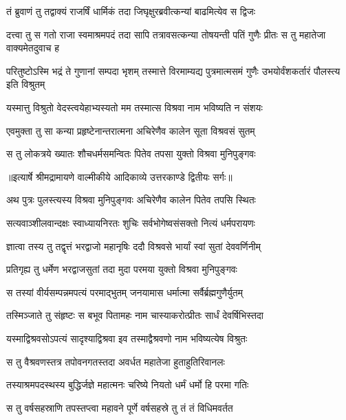 \twolineshloka
{तं ब्रुवाणं तु तद्वाक्यं राजर्षिं धार्मिकं तदा}
{जिघृक्षुरब्रवीत्कन्यां बाढमित्येव स द्विजः} %

\threelineshloka
{दत्त्वा तु स गतो राजा स्वमाश्रमपदं तदा}
{सापि तत्रावसत्कन्या तोषयन्ती पतिं गुणैः}
{प्रीतः स तु महातेजा वाक्यमेतदुवाच ह} %

\threelineshloka
{परितुष्टोऽस्मि भद्रं ते गुणानां सम्पदा भृशम्}
{तस्मात्ते विरमाम्यद्य पुत्रमात्मसमं गुणैः}
{उभयोर्वंशकर्तारं पौलस्त्य इति विश्रुतम्} %

\twolineshloka
{यस्मात्तु विश्रुतो वेदस्त्वयेहाभ्यस्यतो मम}
{तस्मात्स विश्रवा नाम भविष्यति न संशयः} %

\twolineshloka
{एवमुक्ता तु सा कन्या प्रहृष्टेनान्तरात्मना}
{अचिरेणैव कालेन सूता विश्रवसं सुतम्} %

\twolineshloka
{स तु लोकत्रये ख्यातः शौचधर्मसमन्वितः}
{पितेव तपसा युक्तो विश्रवा मुनिपुङ्गवः} %


{॥इत्यार्षे श्रीमद्रामायणे वाल्मीकीये आदिकाव्ये उत्तरकाण्डे द्वितीयः सर्गः॥}


\twolineshloka
{अथ पुत्रः पुलस्त्यस्य विश्रवा मुनिपुङ्गवः}
{अचिरेणैव कालेन पितेव तपसि स्थितः} %

\twolineshloka
{सत्यवाञ्शीलवान्दक्षः स्वाध्यायनिरतः शुचिः}
{सर्वभोगेष्वसंसक्तो नित्यं धर्मपरायणः} %

\twolineshloka
{ज्ञात्वा तस्य तु तद्वृत्तं भरद्वाजो महानृषिः}
{ददौ विश्रवसे भार्यां स्वां सुतां देववर्णिनीम्} %

\twolineshloka
{प्रतिगृह्य तु धर्मेण भरद्वाजसुतां तदा}
{मुदा परमया युक्तो विश्रवा मुनिपुङ्गवः} %

\twolineshloka
{स तस्यां वीर्यसम्पन्नमपत्यं परमाद्भुतम्}
{जनयामास धर्मात्मा सर्वैर्ब्रह्मगुणैर्युतम्} %

\twolineshloka
{तस्मिञ्जाते तु संहृष्टः स बभूव पितामहः}
{नाम चास्याकरोत्प्रीतः सार्धं देवर्षिभिस्तदा} %

\twolineshloka
{यस्माद्विश्रवसोऽपत्यं सादृश्याद्विश्रवा इव}
{तस्माद्वैश्रवणो नाम भविष्यत्येष विश्रुतः} %

\twolineshloka
{स तु वैश्रवणस्तत्र तपोवनगतस्तदा}
{अवर्धत महातेजा हुताहुतिरिवानलः} %

\twolineshloka
{तस्याश्रमपदस्थस्य बुद्धिर्जज्ञे महात्मनः}
{चरिष्ये नियतो धर्मं धर्मो हि परमा गतिः} %

\twolineshloka
{स तु वर्षसहस्राणि तपस्तप्त्वा महावने}
{पूर्णे वर्षसहस्रे तु तं तं विधिमवर्तत} %


